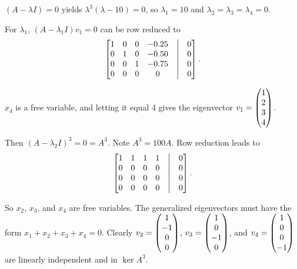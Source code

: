 $(A-\lambda I) = 0$ yields $\lambda^3 (\lambda-10) = 0$, so $\lambda_1 = 10$ and $\lambda_2 = \lambda_3 = \lambda_4 = 0$.

\nl For $\lambda_1$, $(A-\lambda_1 I)v_1 = 0$ can be row reduced to 
$$\begin{bmatrix}
    1 & 0 & 0 & -0.25 & \bigm| & 0 \\
    0 & 1 & 0 & -0.50 & \bigm| & 0 \\
    0 & 0 & 1 & -0.75 & \bigm| & 0 \\
    0 & 0 & 0 & 0 & \bigm|& 0 \\
\end{bmatrix}.$$

$x_4$ is a free variable, and letting it equal 4 gives the eigenvector $v_1 = \vvec{1}{2}{3}{4}$.

Then $(A-\lambda_2 I)^3 = 0 = A^3$. Note $A^3 = 100A$. Row reduction leads to 
$$\begin{bmatrix}
    1 & 1 & 1 & 1 & \bigm| & 0 \\
    0 & 0 & 0 & 0 & \bigm|& 0 \\
    0 & 0 & 0 & 0 & \bigm|& 0 \\
    0 & 0 & 0 & 0 & \bigm|& 0 \\
\end{bmatrix}.$$

So $x_2$, $x_3$, and $x_4$ are free variables. The generalized eigenvectors must have the form $x_1 + x_2 + x_3 + x_4 = 0$. Clearly $v_2 = \vvec{1}{-1}{0}{0}$, $v_3 = \vvec{1}{0}{-1}{0}$, and $v_4 = \vvec{1}{0}{0}{-1}$ are linearly independent and in $\ker{A^3}$.